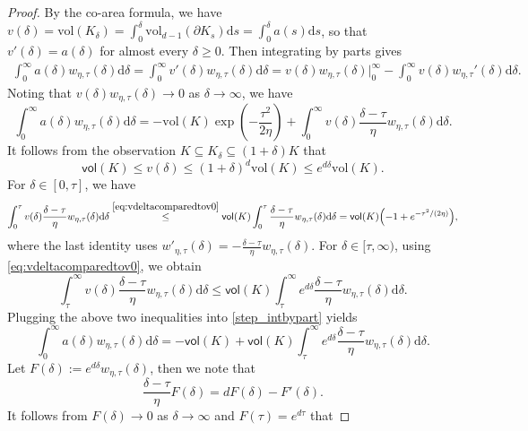 \documentclass[11pt,letterpaper]{article}
\newcommand{\D}{\mathrm{d}}
\newcommand{\vol}{\mathsf{vol}}
\begin{document}
\begin{proof}
By the co-area formula, we have $v(\delta) = \mathrm{vol}(K_\delta) = \int_0^{\delta} \mathrm{vol}_{d-1}(\partial K_s) \D s = \int_0^{\delta} a(s) \D s$, so that  $v'(\delta)=a(\delta)$ for almost every $\delta\ge 0$. Then integrating by parts gives
\begin{align}
\label{intbypart}
 \int_0^\infty a(\delta) w_{\eta,\tau}(\delta)  \D \delta=  \int_0^\infty v'(\delta) w_{\eta,\tau}(\delta)  \D \delta
  =
  v(\delta)w_{\eta,\tau}(\delta)\bigg|_{0}^{\infty}
  - \int_0^\infty v(\delta) w_{\eta,\tau}'(\delta)  \D \delta.
\end{align}
Noting that $v(\delta)w_{\eta,\tau}(\delta)\to 0$ as $\delta\to\infty$, we have
\begin{equation}
\label{step_intbypart}
  \int_0^\infty a(\delta) w_{\eta,\tau}(\delta)  \D \delta
  =
  -\mathrm{vol} (K)\exp\!\left(-\frac{\tau^2}{2\eta}\right)
  + \int_0^\infty v(\delta) \frac{\delta-\tau}{\eta} w_{\eta,\tau}(\delta)  \D \delta.
\end{equation}
It follows from the observation $K\subseteq K_\delta\subseteq (1+\delta)K$ that
\begin{equation}
\label{eq:vdeltacomparedtov0}
  \vol(K)\le v(\delta)\le (1+\delta)^d \mathrm{vol} (K)\le e^{ d \delta} \mathrm{vol} (K).
\end{equation}
For $\delta \in [0,\tau]$, we have
\[
\int_0^\tau v(\delta)\frac{\delta-\tau}{\eta}w_{\eta,\tau}(\delta) \D\delta
\stackrel{\eqref{eq:vdeltacomparedtov0}}\le
\vol(K)\int_0^\tau \frac{\delta-\tau}{\eta}w_{\eta,\tau}(\delta) \D\delta
=
\vol(K)\Bigl(-1+e^{-\tau^2/(2\eta)}\Bigr),
\]
where the last identity uses $w'_{\eta,\tau}(\delta)=-\frac{\delta-\tau}{\eta}w_{\eta,\tau}(\delta)$.
For $\delta \in [\tau,\infty)$, using \eqref{eq:vdeltacomparedtov0}, we obtain
\[
\int_\tau^\infty v(\delta)\frac{\delta-\tau}{\eta}w_{\eta,\tau}(\delta) \D\delta
\le
\vol(K)\int_\tau^\infty e^{d\delta}\frac{\delta-\tau}{\eta}w_{\eta,\tau}(\delta) \D\delta.
\]
Plugging the above two inequalities into \eqref{step_intbypart} yields
\begin{equation}
\int_0^\infty a(\delta) w_{\eta,\tau}(\delta) \D\delta
=
-\vol(K)
+\vol(K)\int_\tau^\infty e^{d\delta}\frac{\delta-\tau}{\eta}w_{\eta,\tau}(\delta) \D\delta.
\label{step_intbypart_split}
\end{equation}
Let $F(\delta):=e^{d\delta}w_{\eta,\tau}(\delta)$, then we note that
\[
  \frac{\delta-\tau}{\eta}F(\delta)=dF(\delta)-F'(\delta).
\]
It follows from $F(\delta)\to 0$ as $\delta\to\infty$ and $F(\tau)=e^{d\tau}$ that

\end{proof}
\end{document}
